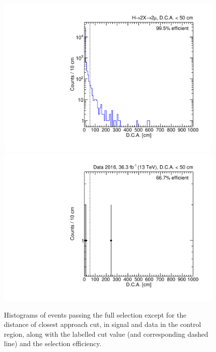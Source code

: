 \begin{figure}[p]
  \centering
  \includegraphics[width=\DSquareWidth]{figures/displaced/NM1_2Mu2J_DCA.pdf}
  \hspace*{-2em}
  \includegraphics[width=\DSquareWidth]{figures/displaced/NM1_Data_DCA.pdf}
  \caption[Histograms of events passing the full selection except for the distance of closest approach cut in \twoMu signal and data.]{Histograms of events passing the full selection except for the distance of closest approach cut, in  \twoMu signal and  data in the control region, along with the labelled cut value (and corresponding dashed line) and the selection efficiency.}
  \label{fig:dd:NM1_DCA}
\end{figure}

